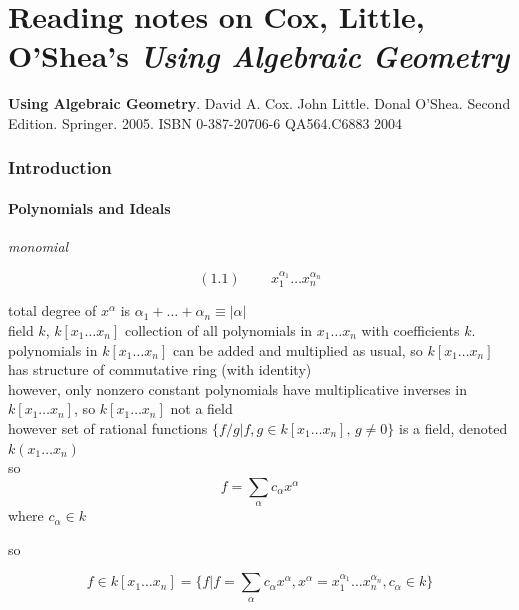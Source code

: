\part{Reading notes on Cox, Little, O'Shea's \emph{Using Algebraic Geometry}}


\textbf{Using Algebraic Geometry}.  David A. Cox.  John Little. Donal O'Shea. Second Edition.  Springer.  2005.  ISBN 0-387-20706-6 QA564.C6883 2004

\section{ Introduction }

\subsection{ Polynomials and Ideals }

\emph{monomial } 

\begin{equation}
  (1.1) \quad \quad \, x_1^{\alpha_1} \dots x_n^{\alpha_n}
\end{equation}

total degree of $x^{\alpha}$ is $\alpha_1 + \dots + \alpha_n \equiv |\alpha|$ \\



field $k$, $k[x_1 \dots x_n]$ collection of all polynomials in $x_1 \dots x_n$ with coefficients $k$.   \\

polynomials in $k[x_1 \dots x_n]$ can be added and multiplied as usual, so $k[x_1 \dots x_n]$ has structure of commutative ring (with identity) \\
however, only nonzero constant polynomials have multiplicative inverses in $k[x_1 \dots x_n]$, so $k[x_1 \dots x_n]$ not a field \\
\quad however set of rational functions $\lbrace f/g | f,g \in k[x_1 \dots x_n], \, g\neq 0\rbrace$ is a field, denoted $k(x_1 \dots x_n)$ \\

so
\[
f = \sum_{\alpha} c_{\alpha}x^{\alpha}
\]
where $c_{\alpha} \in k$

so

\[
f \in k [x_1 \dots x_n ] = \lbrace f | f = \sum_{\alpha} c_{\alpha} x^{\alpha} , x^{\alpha} = x_1^{\alpha_1} \dots x_n^{\alpha_n}, c_{\alpha} \in k \rbrace
\]

